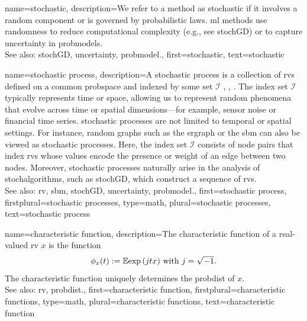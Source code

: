 {name={stochastic},
	description={We refer to a  method as stochastic if it involves a 
		random component or is governed by probabilistic laws. \Gls{ml} methods use randomness 
		to reduce computational complexity (e.g., see \gls{stochGD}) or 
		to capture \gls{uncertainty} in \glspl{probmodel}.
		\\
		See also: \gls{stochGD}, \gls{uncertainty}, \gls{probmodel}.},
	first={stochastic},
	text={stochastic}
}

{name={stochastic process},
	description={A \gls{stochastic} process is a collection of 
		\glspl{rv} defined on a common \gls{probspace} and indexed by some set 
		$\mathcal{I}$ \cite{GrayProbBook}, \cite{papoulis}, \cite{Brockwell91}. The index set 
		$\mathcal{I}$ typically represents time or space, allowing us to represent 
		random phenomena that evolve across time or spatial dimensions—for example, 
		sensor noise or financial time series. \Gls{stochastic} processes are not limited 
		to temporal or spatial settings. For instance, random \glspl{graph} such as 
		the \gls{ergraph} or the \gls{sbm} can also be viewed as \gls{stochastic} processes. 
		Here, the index set $\mathcal{I}$ consists of node pairs that index \glspl{rv} whose values 
		encode the presence or weight of an edge between two nodes. Moreover, \gls{stochastic} 
		processes naturally arise in the analysis of \glspl{stochalgorithm}, 
		such as \gls{stochGD}, which construct a sequence of \glspl{rv}. 
		\\
		See also:  \gls{rv}, \gls{sbm}, \gls{stochGD}, \gls{uncertainty}, \gls{probmodel}.},
	first={stochastic process},
	firstplural={stochastic processes},
	type=math, 
	plural={stochastic processes},
	text={stochastic process}
}

{name={characteristic function},
	description={The characteristic \gls{function} 
		of a real-valued \gls{rv} $x$ is the \gls{function} \cite[Sec. 26]{BillingsleyProbMeasure}
		$$ \phi_{x}(t) := \mathbb{E} { \exp\,(j t x) } \mbox{ with } j = \sqrt{-1}.$$
	 	The characteristic \gls{function} uniquely determines the \gls{probdist} of $x$. 
		\\
		See also: \gls{rv}, \gls{probdist}.},
	first={characteristic function},
	firstplural={characteristic functions}, 
	type=math, 
	plural={characteristic functions},
	text={characteristic function}
}

